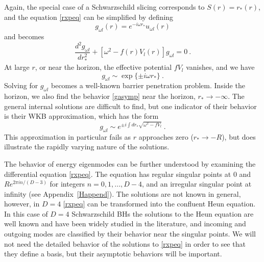 \documentclass[11pt]{article}
\numberwithin{equation}{section}
\newcommand{\beq}{\begin{equation}}
\newcommand{\eeq}{\end{equation}}
\begin{document}
Again, 
the special case of a Schwarzschild slicing corresponds to $S(r)=r_*(r)$, and  the equation \eqref{rxpeq} can be simplified by defining
\beq\label{rescm}
 g_{\omega l}(r)=e^{-i\omega r_*} u_{\omega l}(r)
\eeq
and becomes
\beq\label{diffeq}
\frac{d^2 g_{\omega l} }{d r_*^2}  + \left[\omega^2-f(r)V_l(r)\right] g_{\omega l} =0\ .
\eeq
At large $r$, or near the horizon, the effective potential $fV_l$ vanishes, and we have 
\beq\label{gasymp}
g_{\omega l}\sim \exp\{\pm i \omega r_*\}\ .
\eeq
Solving for $g_{\omega l}$ becomes a well-known barrier penetration problem.  Inside the horizon, we also find the behavior \eqref{gasymp} near the horizon, $r_*\rightarrow-\infty$.  The general internal solutions are difficult to find, but one indicator of their behavior is their WKB approximation, which has the form
\beq
g_{\omega l} \sim e^{\pm i \int dr_* \sqrt{\omega^2 -fV_l}}\ .
\eeq
This approximation in particular fails as $r$ approaches zero ($r_*\rightarrow-R$), but does illustrate the rapidly varying nature of the solutions.

The behavior of energy eigenmodes can be further understood by examining the differential equation \eqref{rxpeq}. The equation has regular singular points at $0$ and $R e^{2 \pi i n/ (D-3)}$ for integers $n = 0, 1,..., D-4$, and an irregular singular point at infinity (see Appendix~\ref{Happend}). The  solutions are not known in general, however, in $D=4$ \eqref{rxpeq} can be transformed into the confluent Heun equation. In this case of  $D=4$ Schwarzschild BHs the solutions to the Heun equation are well known and have been widely studied in the literature, and incoming and outgoing modes are classified by their behavior near the singular points. We will not need the detailed behavior of the solutions to  \eqref{rxpeq} in order to see that they define a basis, but their asymptotic behaviors will be important.  
\end{document}
